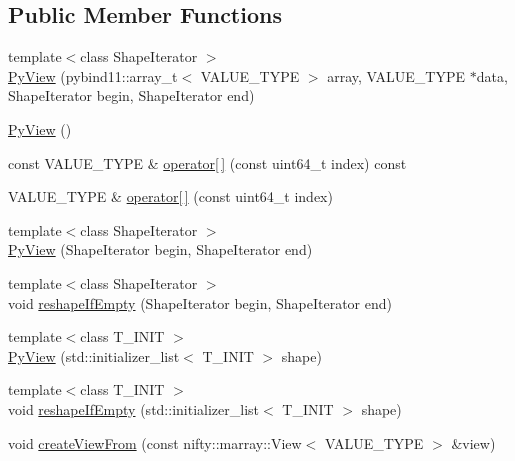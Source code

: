 \subsection*{Public Member Functions}
\begin{DoxyCompactItemize}
\item 
{\footnotesize template$<$class Shape\+Iterator $>$ }\\\hyperlink{classnifty_1_1marray_1_1PyView_a1c3e1533712d9197ebcdbfded78532e8}{Py\+View} (pybind11\+::array\+\_\+t$<$ V\+A\+L\+U\+E\+\_\+\+T\+Y\+P\+E $>$ array, V\+A\+L\+U\+E\+\_\+\+T\+Y\+P\+E $\ast$data, Shape\+Iterator begin, Shape\+Iterator end)
\item 
\hyperlink{classnifty_1_1marray_1_1PyView_afe98775fe6a9b821f3e98f97b352f980}{Py\+View} ()
\item 
const V\+A\+L\+U\+E\+\_\+\+T\+Y\+P\+E \& \hyperlink{classnifty_1_1marray_1_1PyView_ae5eb7b78ed8c6d3478e44a66b04d8aff}{operator\mbox{[}$\,$\mbox{]}} (const uint64\+\_\+t index) const 
\item 
V\+A\+L\+U\+E\+\_\+\+T\+Y\+P\+E \& \hyperlink{classnifty_1_1marray_1_1PyView_a64d9ff12fbe42e31b957b63180fceb82}{operator\mbox{[}$\,$\mbox{]}} (const uint64\+\_\+t index)
\item 
{\footnotesize template$<$class Shape\+Iterator $>$ }\\\hyperlink{classnifty_1_1marray_1_1PyView_aceeb7d7fb74e9dad8a6d930440dfb780}{Py\+View} (Shape\+Iterator begin, Shape\+Iterator end)
\item 
{\footnotesize template$<$class Shape\+Iterator $>$ }\\void \hyperlink{classnifty_1_1marray_1_1PyView_a2141d44a685df3c8f24afafc76c86197}{reshape\+If\+Empty} (Shape\+Iterator begin, Shape\+Iterator end)
\item 
{\footnotesize template$<$class T\+\_\+\+I\+N\+I\+T $>$ }\\\hyperlink{classnifty_1_1marray_1_1PyView_a2a86aa379876d3ed5d81ed3b42bd094f}{Py\+View} (std\+::initializer\+\_\+list$<$ T\+\_\+\+I\+N\+I\+T $>$ shape)
\item 
{\footnotesize template$<$class T\+\_\+\+I\+N\+I\+T $>$ }\\void \hyperlink{classnifty_1_1marray_1_1PyView_a88cd936f03f7f4ba07ee7eb4dce4f6eb}{reshape\+If\+Empty} (std\+::initializer\+\_\+list$<$ T\+\_\+\+I\+N\+I\+T $>$ shape)
\item 
void \hyperlink{classnifty_1_1marray_1_1PyView_abd0258ab2bf010a8b2fb07143161bf78}{create\+View\+From} (const nifty\+::marray\+::\+View$<$ V\+A\+L\+U\+E\+\_\+\+T\+Y\+P\+E $>$ \&view)
\end{DoxyCompactItemize}

